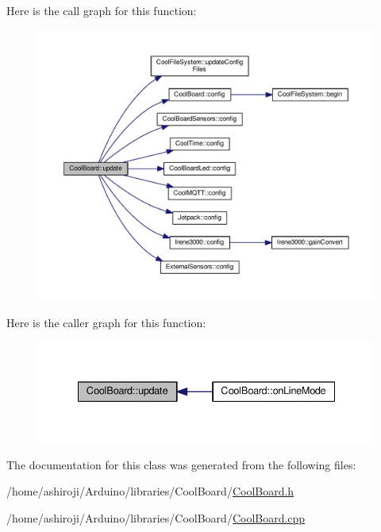 Here is the call graph for this function\+:\nopagebreak
\begin{figure}[H]
\begin{center}
\leavevmode
\includegraphics[width=350pt]{class_cool_board_a8612756d3f73198cdde857a66f0fe690_cgraph}
\end{center}
\end{figure}
Here is the caller graph for this function\+:\nopagebreak
\begin{figure}[H]
\begin{center}
\leavevmode
\includegraphics[width=335pt]{class_cool_board_a8612756d3f73198cdde857a66f0fe690_icgraph}
\end{center}
\end{figure}


The documentation for this class was generated from the following files\+:\begin{DoxyCompactItemize}
\item 
/home/ashiroji/\+Arduino/libraries/\+Cool\+Board/\hyperlink{_cool_board_8h}{Cool\+Board.\+h}\item 
/home/ashiroji/\+Arduino/libraries/\+Cool\+Board/\hyperlink{_cool_board_8cpp}{Cool\+Board.\+cpp}\end{DoxyCompactItemize}
